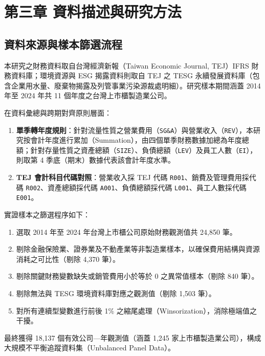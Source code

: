 \documentclass[12pt,a4paper]{article}
\begin{document}
\newpage

\section{第三章 資料描述與研究方法}

\subsection{資料來源與樣本篩選流程}

本研究之財務資料取自台灣經濟新報（Taiwan Economic Journal, TEJ）IFRS 財務資料庫；環境資源與 ESG 揭露資料則取自 TEJ 之 TESG 永續發展資料庫（包含企業用水量、廢棄物揭露及列管事業污染源裁處明細）。研究樣本期間涵蓋 2014 年至 2024 年共 11 個年度之台灣上市櫃製造業公司。

在資料彙總與跨期對齊原則層面：
\begin{enumerate}[leftmargin=*]
    \item \textbf{單季轉年度規則}：針對流量性質之營業費用（\texttt{SG\&A}）與營業收入（\texttt{REV}），本研究按會計年度進行累加（Summation），由四個單季財務數據加總為年度總額；針對存量性質之資產總額（\texttt{SIZE}）、負債總額（\texttt{LEV}）及員工人數（\texttt{EI}），則取第 4 季底（期末）數據代表該會計年度水準。
    \item \textbf{TEJ 會計科目代碼對照}：營業收入採 TEJ 代碼 \texttt{R001}、銷費及管理費用採代碼 \texttt{R002}、資產總額採代碼 \texttt{A001}、負債總額採代碼 \texttt{L001}、員工人數採代碼 \texttt{E001}。
\end{enumerate}

實證樣本之篩選程序如下：
\begin{enumerate}[leftmargin=*]
    \item 選取 2014 年至 2024 年台灣上市櫃公司原始財務觀測值共 24,850 筆。
    \item 剔除金融保險業、證券業及不動產業等非製造業樣本，以確保費用結構與資源消耗之可比性（剔除 4,370 筆）。
    \item 剔除關鍵財務變數缺失或銷管費用小於等於 0 之異常值樣本（剔除 840 筆）。
    \item 剔除無法與 TESG 環境資料庫對應之觀測值（剔除 1,503 筆）。
    \item 對所有連續型變數進行前後 1\% 之縮尾處理（Winsorization），消除極端值之干擾。
\end{enumerate}

最終獲得 18,137 個有效公司—年觀測值（涵蓋 1,245 家上市櫃製造業公司），構成大規模不平衡追蹤資料集（Unbalanced Panel Data）。
\end{document}
